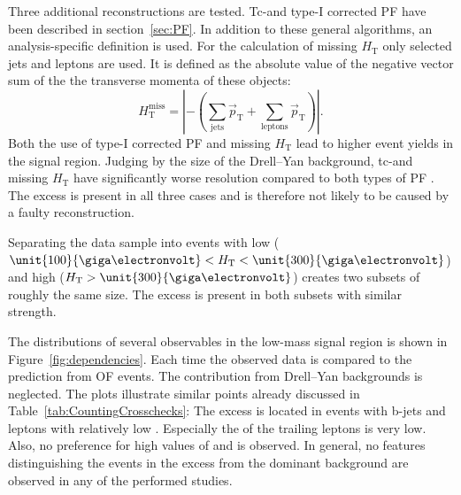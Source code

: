 Three additional \MET reconstructions are tested. Tc-\MET and type-I corrected PF \MET have been described in section~\ref{sec:PF}. In addition to these general algorithms, an analysis-specific definition is used. For the calculation of missing $H_{\mathrm{T}}$ only selected jets and leptons are used. It is defined as the absolute value of the negative vector sum of the the transverse momenta of these objects: 
\begin{equation*}
H_{\mathrm{T}}^{\mathrm{miss}} = | -(\sum\limits_{\mathrm{jets}}\vec{p}_{\mathrm{T}} + \sum\limits_{\mathrm{leptons}}\vec{p}_{\mathrm{T}}) |.
\end{equation*}  
Both the use of type-I corrected PF \MET and missing $H_{\mathrm{T}}$ lead to higher event yields in the signal region. Judging by the size of the Drell--Yan background, tc-\MET and missing $H_{\mathrm{T}}$ have significantly worse \MET resolution compared to both types of PF \MET. The excess is present in all three cases and is therefore not likely to be caused by a faulty \MET reconstruction. 

Separating the data sample into events with low \HT ($\unit{100}{\giga\electronvolt} < \HT <\unit{300}{\giga\electronvolt}$) and high \HT ($\HT > \unit{300}{\giga\electronvolt}$) creates two subsets of roughly the same size. The excess is present in both subsets with similar strength. 
 



The distributions of several observables in the low-mass signal region is shown in Figure~\ref{fig:dependencies}. Each time the observed data is compared to the prediction from OF events. The contribution from Drell--Yan backgrounds is neglected. The plots illustrate similar points already discussed in Table~\ref{tab:CountingCrosschecks}: The excess is located in events with b-jets and leptons with relatively low \pt. Especially the \pt of the trailing leptons is very low. Also, no preference for high values of \HT and \MET is observed. In general, no features distinguishing the events in the excess from the dominant \ttbar background are observed in any of the performed studies. 

